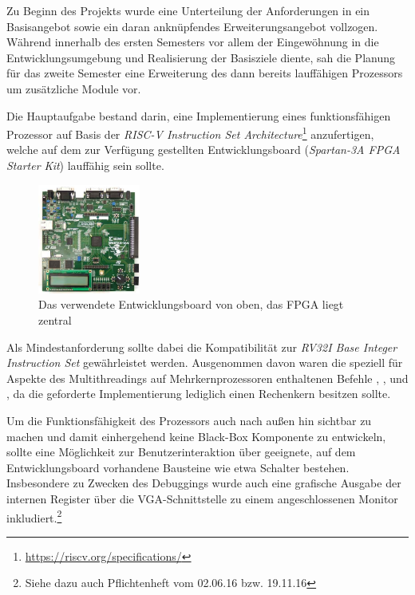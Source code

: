 Zu Beginn des Projekts wurde eine Unterteilung der Anforderungen in ein
Basisangebot sowie ein daran ankn\"upfendes Erweiterungsangebot vollzogen.
W\"ahrend innerhalb des ersten Semesters vor allem der
Eingew\"ohnung in die Entwicklungsumgebung und Realisierung der Basisziele diente,
sah die Planung f\"ur das zweite Semester eine Erweiterung des dann bereits
lauff\"ahigen Prozessors um zus\"atzliche Module vor. 

Die Hauptaufgabe bestand darin, eine Implementierung eines funktionsf\"ahigen
Prozessor auf Basis der \textit{RISC-V Instruction Set Architecture}\footnote{\url{https://riscv.org/specifications/}}
anzufertigen, welche auf dem zur Verf\"ugung gestellten Entwicklungsboard
(\textit{Spartan-3A FPGA Starter Kit}) lauff\"ahig sein sollte.

\begin{figure}[H]
\centering
\label{fig:board}
\includegraphics[width=0.3\textwidth]{Board.png}
\caption{Das verwendete Entwicklungsboard von oben, das FPGA liegt zentral}
\end{figure}

Als Mindestanforderung sollte dabei die Kompatibilit\"at zur
\textit{RV32I Base Integer Instruction Set} gew\"ahrleistet werden. Ausgenommen
davon waren die speziell f\"ur Aspekte des Multithreadings auf
Mehrkernprozessoren enthaltenen Befehle , ,
 und , da die geforderte Implementierung lediglich
einen Rechenkern besitzen sollte.

Um die Funktionsf\"ahigkeit des Prozessors auch nach au\ss{}en hin sichtbar zu
machen und damit einhergehend keine Black-Box Komponente zu entwickeln, sollte
eine M\"oglichkeit zur Benutzerinteraktion \"uber geeignete, auf dem
Entwicklungsboard vorhandene Bausteine wie etwa Schalter bestehen. Insbesondere
zu Zwecken des Debuggings wurde auch eine grafische Ausgabe der internen
Register \"uber die VGA-Schnittstelle zu einem angeschlossenen Monitor
inkludiert.\footnote{Siehe dazu auch Pflichtenheft vom 02.06.16 bzw. 19.11.16}

